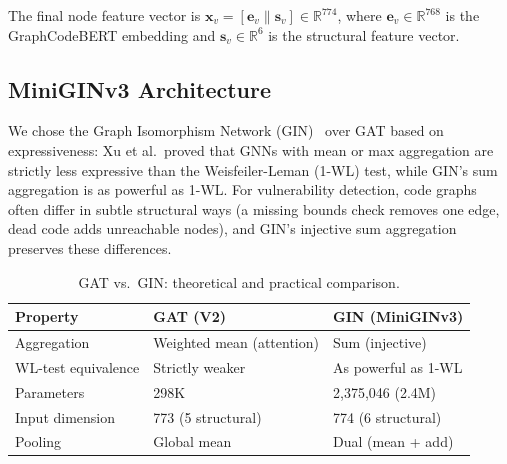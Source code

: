 The final node feature vector is $\mathbf{x}_v = [\mathbf{e}_v \| \mathbf{s}_v] \in \mathbb{R}^{774}$, where $\mathbf{e}_v \in \mathbb{R}^{768}$ is the GraphCodeBERT embedding and $\mathbf{s}_v \in \mathbb{R}^{6}$ is the structural feature vector.

\subsection{MiniGINv3 Architecture}

We chose the Graph Isomorphism Network (GIN)~\cite{xu2019gin} over GAT based on expressiveness: Xu et al.\ proved that GNNs with mean or max aggregation are strictly less expressive than the Weisfeiler-Leman (1-WL) test, while GIN's sum aggregation is as powerful as 1-WL. For vulnerability detection, code graphs often differ in subtle structural ways (a missing bounds check removes one edge, dead code adds unreachable nodes), and GIN's injective sum aggregation preserves these differences.

\begin{table}[H]
\centering
\small
\caption{GAT vs.\ GIN: theoretical and practical comparison.}
\label{tab:gat-vs-gin}
\begin{tabular}{lll}
\toprule
\textbf{Property} & \textbf{GAT (V2)} & \textbf{GIN (MiniGINv3)} \\
\midrule
Aggregation        & Weighted mean (attention) & Sum (injective) \\
WL-test equivalence & Strictly weaker & As powerful as 1-WL \\
Parameters         & 298K & 2,375,046 (2.4M) \\
Input dimension    & 773 (5 structural) & 774 (6 structural) \\
Pooling            & Global mean & Dual (mean + add) \\
\bottomrule
\end{tabular}
\end{table}

